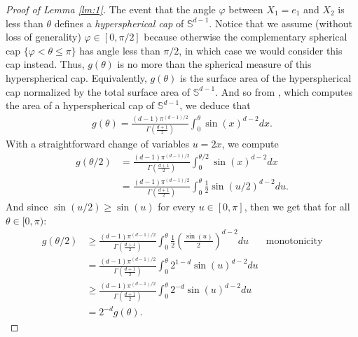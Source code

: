\documentclass{article}
\begin{document}
\begin{proof}[Proof of Lemma \ref{lm:1}]
The event that the angle $\varphi$ between $X_1 = e_1$ and $X_2$ is less than $\theta$ defines a \textit{hyperspherical cap} of $\mathbb{S}^{d-1}$. Notice that we assume (without loss of generality) $\varphi \in [0, \pi/2]$ because otherwise the complementary spherical cap $\{ \varphi < \theta \leq \pi \}$ has angle less than $\pi/2$, in which case we would consider this cap instead. Thus, $g(\theta)$ is no more than the spherical measure of this hyperspherical cap. Equivalently, $g(\theta)$ is the surface area of the hyperspherical cap normalized by the total surface area of $\mathbb{S}^{d-1}$. And so from \cite{li2011hyper}, which computes the area of a hyperspherical cap of $\mathbb{S}^{d-1}$, we deduce that
\begin{align*}
    g(\theta) = \frac{(d-1) \pi^{(d-1)/2}}{\Gamma \left( \frac{d+1}{2} \right)} \int_0^{\theta} \sin(x)^{d-2} dx.
\end{align*}
With a straightforward change of variables $u = 2x$, we compute 
\begin{align*}
    g(\theta/2) &= \frac{(d-1) \pi^{(d-1)/2}}{\Gamma \left( \frac{d+1}{2} \right)} \int_0^{\theta/2} \sin(x)^{d-2} dx\\
     &= \frac{(d-1) \pi^{(d-1)/2}}{\Gamma \left( \frac{d+1}{2} \right)} \int_0^{\theta} \frac{1}{2} \sin(u/2)^{d-2} du.
\end{align*}
And since $\sin(u/2) \geq \sin(u)$ for every $u \in [0, \pi]$, then we get that for all $\theta \in [0, \pi)$:
\begin{align}
    g(\theta/2) &\geq \frac{(d-1) \pi^{(d-1)/2}}{\Gamma \left( \frac{d+1}{2} \right)} \int_0^{\theta} \frac{1}{2} \left( \frac{\sin(u)}{2} \right)^{d-2} du & \text{monotonicity} \nonumber\\
    &= \frac{(d-1) \pi^{(d-1)/2}}{\Gamma \left( \frac{d+1}{2} \right)} \int_0^{\theta} 2^{1-d} \sin(u)^{d-2} du \nonumber\\
    &\geq \frac{(d-1) \pi^{(d-1)/2}}{\Gamma \left( \frac{d+1}{2} \right)} \int_0^{\theta} 2^{-d} \sin(u)^{d-2} du \nonumber\\
    &= 2^{-d} g(\theta).\label{eq3}
\end{align}


\end{proof}
\end{document}
